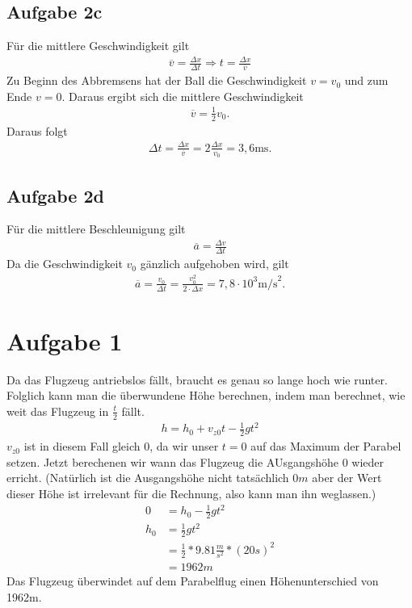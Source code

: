\documentclass[a4paper,11pt]{article}
\begin{document}
\subsection*{Aufgabe 2c}
Für die mittlere Geschwindigkeit gilt
\begin{align*}
  \overline{v} = \frac{\Delta x}{\Delta t} \Rightarrow t = \frac{\Delta x}{\overline{v}}
\end{align*}
Zu Beginn des Abbremsens hat der Ball die Geschwindigkeit $v = v_0$ und zum Ende $v = 0$. Daraus ergibt sich die mittlere Geschwindigkeit
\begin{align*}
  \overline{v} = \frac{1}{2} v_0 \mbox{.}
\end{align*}
Daraus folgt
\begin{align*}
  \Delta t = \frac{\Delta x}{\overline{v}} = 2\frac{\Delta x}{v_0} = 3,6 \mbox{ms.}
\end{align*}

\subsection*{Aufgabe 2d}
Für die mittlere Beschleunigung gilt
\begin{align*}
  \overline{a} = \frac{\Delta v}{\Delta t}
\end{align*}
Da die Geschwindigkeit $v_0$ gänzlich aufgehoben wird, gilt
\begin{align*}
  \overline{a} = \frac{v_0}{\Delta t} = \frac{v_0^2}{2\cdot\Delta x} = 7,8\cdot 10^3 \mbox{m/s}^2\mbox{.}
\end{align*}




\section*{Aufgabe 1}
  Da das Flugzeug antriebslos fällt, braucht es genau so lange hoch wie runter. Folglich kann man die überwundene Höhe berechnen, indem man berechnet, wie weit das Flugzeug in $\frac{t}{2}$ fällt.
  \begin{align*}
    h = h_0 + v_{z0}t-\frac{1}{2}gt^2
  \end{align*}
  $v_{z0}$ ist in diesem Fall gleich $0$, da wir unser $t=0$ auf das Maximum der Parabel setzen. Jetzt berechenen wir wann das Flugzeug die AUsgangshöhe $0$ wieder erricht. (Natürlich ist die Ausgangshöhe nicht tatsächlich $0m$ aber der Wert dieser Höhe ist irrelevant für die Rechnung, also kann man ihn weglassen.)
  \begin{align*}
    0 &= h_0 - \frac{1}{2}gt^2 \\
    h_0 &= \frac{1}{2}gt^2 \\
    &=\frac{1}{2}*9.81\frac{m}{s^2}*(20s)^2 \\
    &=1962m
  \end{align*}
  Das Flugzeug überwindet auf dem Parabelflug einen Höhenunterschied von 1962m.
\end{document}
